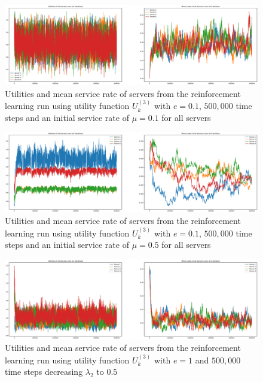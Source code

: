 \begin{figure}[H]
    \includegraphics[width=\textwidth]{chapters/00_appendix/03_more_rl_results/Bin/utility_3_eps/u3_3_initial_01.eps}
    \caption{Utilities and mean service rate of servers from the reinforcement
    learning run using utility function \(U_k^{(3)}\) with \(e = 0.1\),
    \(500,\!000\) time steps and an initial service rate of \(\mu = 0.1\) for all
    servers}
    \label{fig:RL_utility3_3_initial_01}
\end{figure}

\begin{figure}[H]
    \includegraphics[width=\textwidth]{chapters/00_appendix/03_more_rl_results/Bin/utility_3_eps/u3_3_initial_05.eps}
    \caption{Utilities and mean service rate of servers from the reinforcement
    learning run using utility function \(U_k^{(3)}\) with \(e = 0.1\),
    \(500,\!000\) time steps and an initial service rate of \(\mu = 0.5\) for all
    servers}
    \label{fig:RL_utility3_3_initial_05}
\end{figure}

\begin{figure}[H]
    \includegraphics[width=\textwidth]{chapters/00_appendix/03_more_rl_results/Bin/utility_3_eps/u3_4_lambda2_05.eps}
    \caption{Utilities and mean service rate of servers from the reinforcement
    learning run using utility function \(U_k^{(3)}\) with \(e = 1\) and
    \(500,\!000\) time steps decreasing \(\lambda_2\) to \(0.5\)}
    \label{fig:RL_utility3_4_lambda2_05}
\end{figure}

